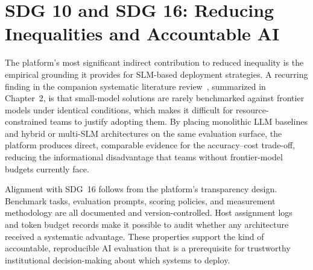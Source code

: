 \section*{SDG 10 and SDG 16: Reducing Inequalities and Accountable AI}

The platform's most significant indirect contribution to reduced inequality is the empirical
grounding it provides for SLM-based deployment strategies.
A recurring finding in the companion systematic literature review~\cite{slrmanuscript2026}, summarized in Chapter~2, is that small-model
solutions are rarely benchmarked against frontier models under identical conditions, which
makes it difficult for resource-constrained teams to justify adopting them.
By placing monolithic LLM baselines and hybrid or multi-SLM architectures on the same
evaluation surface, the platform produces direct, comparable evidence for the accuracy--cost
trade-off, reducing the informational disadvantage that teams without frontier-model budgets
currently face.

Alignment with SDG~16 follows from the platform's transparency design.
Benchmark tasks, evaluation prompts, scoring policies, and measurement methodology are all
documented and version-controlled.
Host assignment logs and token budget records make it possible to audit whether any
architecture received a systematic advantage.
These properties support the kind of accountable, reproducible AI evaluation that is a
prerequisite for trustworthy institutional decision-making about which systems to deploy.
